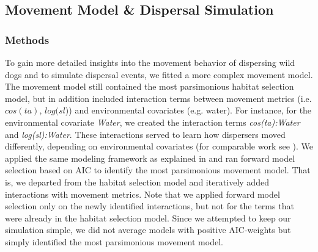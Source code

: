 \documentclass[abstract=on,10pt,a4paper,bibliography=totocnumbered]{scrartcl}
\begin{document}
\newpage
\subsection{Movement Model \& Dispersal Simulation}
\label{Appendix:DispersalSimulation}
\subsubsection{Methods}
To gain more detailed insights into the movement behavior of dispersing wild
dogs and to simulate dispersal events, we fitted a more complex movement model.
The movement model still contained the most parsimonious habitat selection
model, but in addition included interaction terms between movement metrics (i.e.
\(cos(ta)\), \(log(sl\))) and environmental covariates (e.g. water). For
instance, for the environmental covariate \textit{Water}, we created the
interaction terms \textit{cos(ta):Water} and \textit{log(sl):Water}. These
interactions served to learn how dispersers moved differently, depending on
environmental covariates (for comparable work see \citealp{Prokopenko.2017}). We
applied the same modeling framework as explained in  and ran
forward model selection based on AIC to identify the most parsimonious movement
model. That is, we departed from the habitat selection model and iteratively
added interactions with movement metrics. Note that we applied forward model
selection only on the newly identified interactions, but not for the terms that
were already in the habitat selection model. Since we attempted to keep our
simulation simple, we did not average models with positive AIC-weights but
simply identified the most parsimonious movement model.
\end{document}
